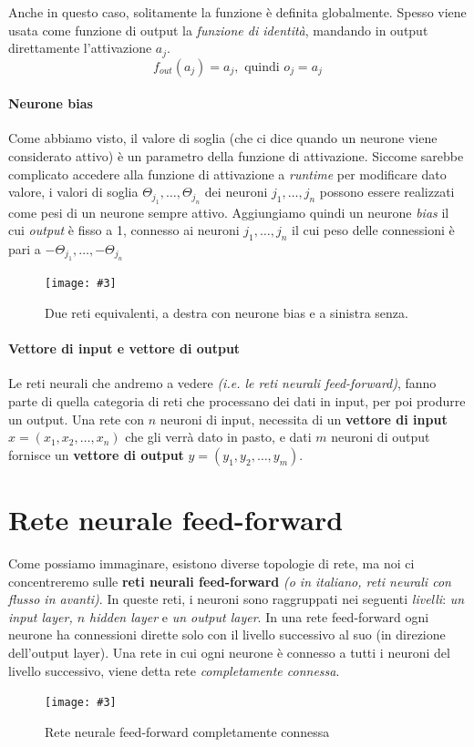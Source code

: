\documentclass[12pt, twoside, letterpaper]{report}
\newcommand{\img}[4] {
	\begin{figure}[h]
		\caption{#1}
		\centering
		\texttt{[image: \#3]}\\
		\label{#4}
	\end{figure}
}
\begin{document}
			 	Anche in questo caso, solitamente la funzione è definita globalmente. Spesso viene usata come funzione di output la \textit{funzione di identità}, mandando in output direttamente l'attivazione $a_j$. $$f_{out}(a_j) = a_j, \text{ quindi } o_j = a_j$$
			 	
			 \paragraph{Neurone bias} Come abbiamo visto, il valore di soglia (che ci dice quando un neurone viene considerato attivo) è un parametro della funzione di attivazione. Siccome sarebbe complicato accedere alla funzione di attivazione a \textit{runtime} per modificare dato valore, i valori di soglia $\Theta_{j_1}, \dots, \Theta_{j_n}$ dei neuroni $j_1, \dots, j_n$ possono essere realizzati come pesi di un neurone sempre attivo. Aggiungiamo quindi un neurone \textit{bias} il cui \textit{output} è fisso a 1, connesso ai neuroni $j_1, \dots, j_n$ il cui peso delle connessioni è pari a $-\Theta_{j_1}, \dots, -\Theta_{j_n}$
			 
			 	\img{Due reti equivalenti, a destra con neurone bias e a sinistra senza.}{0.5}{bias-neuron.png}{bias}
			 	
			 \paragraph{Vettore di input e vettore di output} Le reti neurali che andremo a vedere \textit{(i.e. le reti neurali feed-forward)}, fanno parte di quella categoria di reti che processano dei dati in input, per poi produrre un output. Una rete con $n$ neuroni di input, necessita di un \textbf{vettore di input} $x = (x_1, x_2, \dots, x_n)$ che gli verrà dato in pasto, e dati $m$ neuroni di output fornisce un \textbf{vettore di output} $y = (y_1, y_2, \dots, y_m)$. 	 			 
		\section{Rete neurale feed-forward}
			Come possiamo immaginare, esistono diverse topologie di rete, ma noi ci concentreremo sulle \textbf{reti neurali feed-forward} \textit{(o in italiano, reti neurali con flusso in avanti)}. In queste reti, i neuroni sono raggruppati nei seguenti \textit{livelli}: \textit{un input layer, $n$ hidden layer} e \textit{un output layer}. In una rete feed-forward ogni neurone ha connessioni dirette solo con il livello successivo al suo (in direzione dell'output layer). Una rete in cui ogni neurone è connesso a tutti i neuroni del livello successivo, viene detta rete \textit{completamente connessa}.
			\img{Rete neurale feed-forward completamente connessa}{0.4}{nn-feed-forward.png}{feedforward}
			
\end{document}
